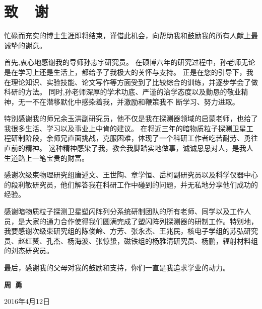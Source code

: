 
\chapter*{\hypertarget{ack}{致~~谢}}
\thispagestyle{empty} %

忙碌而充实的博士生涯即将结束，谨借此机会，向帮助我和鼓励我的所有人献上最诚挚的谢意。

首先,衷心地感谢我的导师孙志宇研究员。
在硕博六年的研究过程中，孙老师无论是在学习上还是生活上，都给予了我极大的关怀与支持。
正是在您的引导下，我在理论知识、实验技能、论文写作等方面受到了比较综合的训练，并逐步学会了做科研的方法。
同时,孙老师深厚的学术功底、严谨的治学态度以及勤恳的敬业精神，无一不在潜移默化中感染着我，并激励和鞭策我不 断学习、努力进取。

特别感谢我的师兄余玉洪副研究员，他不仅是我在探测器领域的启蒙老师，也给了我很多生活、学习以及事业上中肯的建议。
在将近三年的暗物质粒子探测卫星工程研制阶段，余师兄直面挑战，克服困难，体现了一个科研工作者吃苦耐劳、勇往直前的精神。
这种精神感染了我，教会我脚踏实地做事，诚诚恳恳对人，是我人生道路上一笔宝贵的财富。

感谢次级束物理研究组唐述文、王世陶、章学恒、岳柯副研究员以及科学仪器中心的段利敏研究员，他们解答我在科研工作中碰到的问题，并无私地分享他们成功的经验。

感谢暗物质粒子探测卫星塑闪阵列分系统研制团队的所有老师、同学以及工作人员，是大家的通力合作使得我们圆满完成了塑闪阵列探测器的研制工作。特别地，我要感谢次级束研究组的陈俊岭、方芳、张永杰、王兆民，核电子学组的苏弘研究员、赵红赟、孔杰、杨海波、张惊蛰，磁铁组的杨雅清研究员、杨鹏，辐射材料组的刘杰研究员。

最后，感谢我的父母对我的鼓励和支持，你们一直是我追求学业的动力。

\par\hfill
\par\hfill\textbf{周~勇\hspace{10mm}}
\par\hfill 2016年4月12日